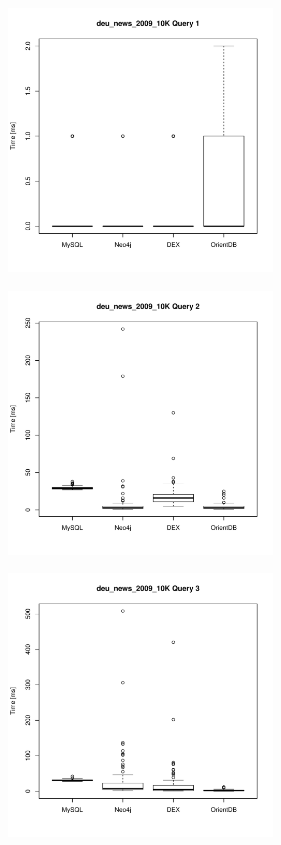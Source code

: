 \documentclass[11pt, a4paper, oneside]{article} %
\begin{document}
\begin{appendix}
\begin{landscape} 
	\newpage
	\thispagestyle{empty}
	
	\begin{figure}[ht]
		\begin{minipage}[hbt]{6.5cm}
			\centering
			\includegraphics[width=7cm]{../results/cold caches/images/10K_query1_boxplot}
			\label{fig:10K_query1_boxplot}
		\end{minipage}
		\hfill
		\begin{minipage}[hbt]{6.5cm}
			\centering
			\includegraphics[width=7cm]{../results/cold caches/images/10K_query2_boxplot}
			\label{fig:10K_query2_boxplot}
		\end{minipage}
		\hfill
		\begin{minipage}[hbt]{6.5cm}
			\centering
			\includegraphics[width=7cm]{../results/cold caches/images/10K_query3_boxplot}
			\label{fig:10K_query3_boxplot}
		\end{minipage}
		

\end{figure}
\end{landscape}
\end{appendix}
\end{document}

